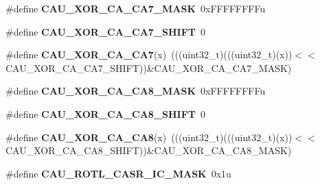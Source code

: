\begin{DoxyCompactItemize}
\item 
\#define {\bfseries C\+A\+U\+\_\+\+X\+O\+R\+\_\+\+C\+A\+\_\+\+C\+A7\+\_\+\+M\+A\+SK}~0x\+F\+F\+F\+F\+F\+F\+F\+Fu\hypertarget{group__CAU__Register__Masks_ga06eab58058cee7fd45b4cd4275568892}{}\label{group__CAU__Register__Masks_ga06eab58058cee7fd45b4cd4275568892}

\item 
\#define {\bfseries C\+A\+U\+\_\+\+X\+O\+R\+\_\+\+C\+A\+\_\+\+C\+A7\+\_\+\+S\+H\+I\+FT}~0\hypertarget{group__CAU__Register__Masks_ga69445bae6fa41c545996396a9af56d61}{}\label{group__CAU__Register__Masks_ga69445bae6fa41c545996396a9af56d61}

\item 
\#define {\bfseries C\+A\+U\+\_\+\+X\+O\+R\+\_\+\+C\+A\+\_\+\+C\+A7}(x)~(((uint32\+\_\+t)(((uint32\+\_\+t)(x))$<$$<$C\+A\+U\+\_\+\+X\+O\+R\+\_\+\+C\+A\+\_\+\+C\+A7\+\_\+\+S\+H\+I\+FT))\&C\+A\+U\+\_\+\+X\+O\+R\+\_\+\+C\+A\+\_\+\+C\+A7\+\_\+\+M\+A\+SK)\hypertarget{group__CAU__Register__Masks_ga697949052f840f6e57c5d343f8753fbd}{}\label{group__CAU__Register__Masks_ga697949052f840f6e57c5d343f8753fbd}

\item 
\#define {\bfseries C\+A\+U\+\_\+\+X\+O\+R\+\_\+\+C\+A\+\_\+\+C\+A8\+\_\+\+M\+A\+SK}~0x\+F\+F\+F\+F\+F\+F\+F\+Fu\hypertarget{group__CAU__Register__Masks_ga5dae0bacc10008301389f42a02bdd3d4}{}\label{group__CAU__Register__Masks_ga5dae0bacc10008301389f42a02bdd3d4}

\item 
\#define {\bfseries C\+A\+U\+\_\+\+X\+O\+R\+\_\+\+C\+A\+\_\+\+C\+A8\+\_\+\+S\+H\+I\+FT}~0\hypertarget{group__CAU__Register__Masks_gab7debaaae0a6137460fd18cf952033ae}{}\label{group__CAU__Register__Masks_gab7debaaae0a6137460fd18cf952033ae}

\item 
\#define {\bfseries C\+A\+U\+\_\+\+X\+O\+R\+\_\+\+C\+A\+\_\+\+C\+A8}(x)~(((uint32\+\_\+t)(((uint32\+\_\+t)(x))$<$$<$C\+A\+U\+\_\+\+X\+O\+R\+\_\+\+C\+A\+\_\+\+C\+A8\+\_\+\+S\+H\+I\+FT))\&C\+A\+U\+\_\+\+X\+O\+R\+\_\+\+C\+A\+\_\+\+C\+A8\+\_\+\+M\+A\+SK)\hypertarget{group__CAU__Register__Masks_gab9536ffd1d268cd301992645fd13d7fa}{}\label{group__CAU__Register__Masks_gab9536ffd1d268cd301992645fd13d7fa}

\item 
\#define {\bfseries C\+A\+U\+\_\+\+R\+O\+T\+L\+\_\+\+C\+A\+S\+R\+\_\+\+I\+C\+\_\+\+M\+A\+SK}~0x1u\hypertarget{group__CAU__Register__Masks_ga872c60c9f23d4d48a0f47cd1f3848540}{}\label{group__CAU__Register__Masks_ga872c60c9f23d4d48a0f47cd1f3848540}


\end{DoxyCompactItemize}

